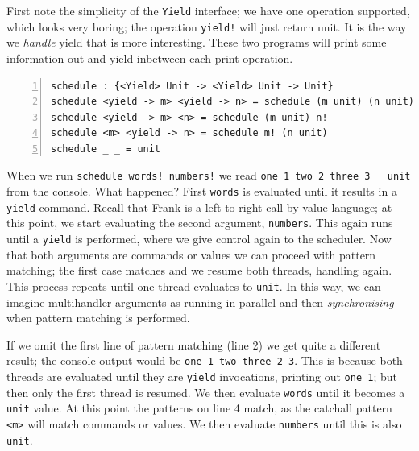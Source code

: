 \documentclass[msc,deptreport,cs]{infthesis} %
\newcommand{\code}[1]{\lstinline{#1}}
\begin{document}
First note the simplicity of the \code{Yield} interface; we have one operation
supported, which looks very boring; the operation \code{yield!} will just return
unit. It is the way we \emph{handle} yield that is more interesting. These two
programs will print some information out and yield inbetween each print
operation.

\begin{lstlisting}[numbers=left]
schedule : {<Yield> Unit -> <Yield> Unit -> Unit}
schedule <yield -> m> <yield -> n> = schedule (m unit) (n unit)
schedule <yield -> m> <n> = schedule (m unit) n!
schedule <m> <yield -> n> = schedule m! (n unit)
schedule _ _ = unit
\end{lstlisting}

When we run \code{schedule words! numbers!} we read \code{one 1 two 2 three 3
  unit} from the console. What happened? First \code{words} is evaluated until
it results in a \code{yield} command. Recall that Frank is a left-to-right
call-by-value language; at this point, we start evaluating the second argument,
\code{numbers}. This again runs until a \code{yield} is performed, where we give
control again to the scheduler. Now that both arguments are commands or values
we can proceed with pattern matching; the first case matches and we resume both
threads, handling again. This process repeats until one thread evaluates to
\code{unit}. In this way, we can imagine multihandler arguments as running in
parallel and then \emph{synchronising} when pattern matching is performed.

If we omit the first line of pattern matching (line 2) we get quite a different
result; the console output would be \code{one 1 two three 2 3}. This is because
both threads are evaluated until they are \code{yield} invocations, printing out
\code{one 1}; but then only the first thread is resumed. We then evaluate
\code{words} until it becomes a \code{unit} value. At this point the patterns on
line 4 match, as the catchall pattern \code{<m>} will match commands or values.
We then evaluate \code{numbers} until this is also \code{unit}.


\end{document}
